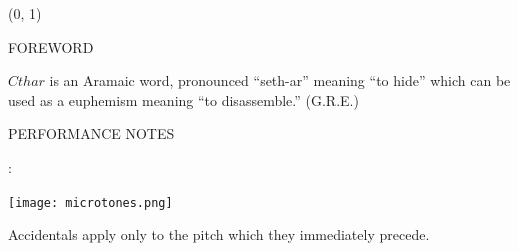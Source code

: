 \documentclass[10pt]{article}
\begin{document}
\begin{textblock}{23}(0, 1)
\begin{center}
\huge FOREWORD
\end{center}
\end{textblock}

\vspace*{0.25\baselineskip}

\begingroup
\begin{center}
$Cthar$ is an Aramaic word, pronounced ``seth-ar'' meaning ``to hide'' which can be used as a euphemism meaning ``to disassemble.''
\rightskip\leftskip
\phantom{text} \hfill (G.R.E.)
\end{center}
\endgroup
  

\begin{center}
\huge PERFORMANCE NOTES
\end{center}

\begin{center}
:
\end{center}

\begin{center}
\texttt{[image: microtones.png]}
\end{center}

\begin{center}
Accidentals apply only to the pitch which they immediately precede.
\end{center}
\end{document}

